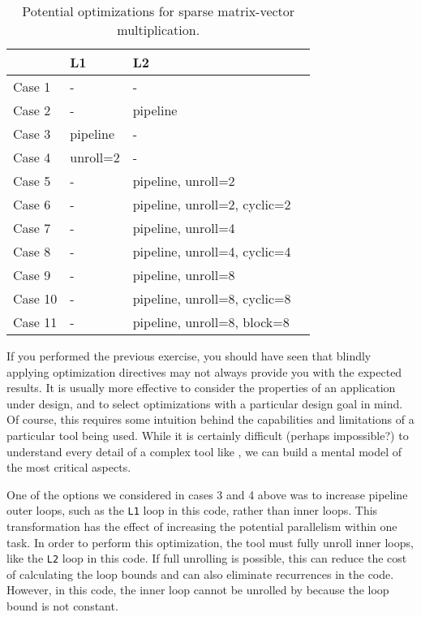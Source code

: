 \begin{table}[htbp]
  \centering
  \caption{Potential optimizations for sparse matrix-vector multiplication. }
	\begin{tabular}{*{4}{l}}
    \toprule
						& L1 		& 		L2 							 \\
    \midrule
    Case 1 & - 			& -  	 \\ 
    Case 2 & - 			& pipeline 	\\ 
    Case 3 & pipeline & - \\
    Case 4 & unroll=2 & - \\ 
    Case 5 & - 			& pipeline, unroll=2 	\\
    Case 6 & - 			& pipeline, unroll=2, cyclic=2 	\\ 
    Case 7 & - 			& pipeline, unroll=4		\\ 
    Case 8 & - 			& pipeline, unroll=4, cyclic=4   \\ 
    Case 9 & - 			& pipeline, unroll=8		\\ 
    Case 10 & - 			& pipeline, unroll=8, cyclic=8   \\ 
    Case 11 & - 			& pipeline, unroll=8, block=8   \\ 
    \bottomrule
  \end{tabular}
  \label{table:spmv_optimizations}
\end{table}

If you performed the previous exercise, you should have seen that blindly applying optimization directives may not always provide you with the expected results. It is usually more effective to consider the properties of an application under design, and to select optimizations with a particular design goal in mind. Of course, this requires some intuition behind the capabilities and limitations of a particular tool being used.  While it is certainly difficult (perhaps impossible?) to understand every detail of a complex tool like \VHLS, we can build a mental model of the most critical aspects.

One of the options we considered in cases 3 and 4 above was to increase pipeline outer loops, such as the \lstinline{L1} loop in this code, rather than inner loops.  This transformation has the effect of increasing the potential parallelism within one task.  In order to perform this optimization, the \VHLS tool must fully unroll inner loops, like the \lstinline{L2} loop in this code. If full unrolling is possible, this can reduce the cost of calculating the loop bounds and can also eliminate recurrences in the code.  However, in this code, the inner loop cannot be unrolled by \VHLS because the loop bound is not constant.

